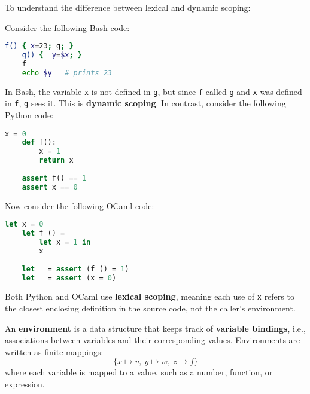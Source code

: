 \newpage 

\noindent
To understand the difference between lexical and dynamic scoping:

\begin{Example}

    \noindent
    Consider the following Bash code:
    
    \begin{lstlisting}[language=bash,numbers=none]
    f() { x=23; g; } 
    g() {  y=$x; }
    f
    echo $y   # prints 23
    \end{lstlisting}
    
    \noindent
    In Bash, the variable \texttt{x} is not defined in \texttt{g}, but since \texttt{f} called \texttt{g} and \texttt{x} was defined in \texttt{f}, \texttt{g} sees it. This is \textbf{dynamic scoping}.
    In contrast, consider the following Python code:

    \begin{lstlisting}[language=python,numbers=none]
    x = 0
    def f():
        x = 1
        return x
    
    assert f() == 1
    assert x == 0
    \end{lstlisting}
    
    \noindent
    Now consider the following OCaml code:
    \begin{lstlisting}[language=ML,numbers=none]
    let x = 0
    let f () = 
        let x = 1 in
        x
    
    let _ = assert (f () = 1)
    let _ = assert (x = 0)
    \end{lstlisting}
    
    \noindent
    Both Python and OCaml use \textbf{lexical scoping}, meaning each use of \texttt{x} refers to the closest enclosing definition in the source code, not the caller's environment.
\end{Example}

\begin{Def}[Environment]

    \label{def:environment}

    \noindent
    An \textbf{environment} is a data structure that keeps track of \textbf{variable bindings}, i.e., associations between variables and their corresponding values. Environments are written as finite mappings:
    \LARGE
    \[
        \{ x \mapsto v,\ y \mapsto w,\ z \mapsto f \}
    \]
    \normalsize
    where each variable is mapped to a value, such as a number, function, or expression.
\end{Def}

